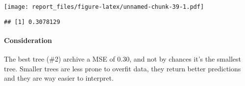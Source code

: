 \documentclass[
]{article}
\newenvironment{Shaded}{\begin{snugshade}}{\end{snugshade}}
\newcommand{\DecValTok}[1]{\textcolor[rgb]{0.00,0.00,0.81}{#1}}
\newcommand{\FunctionTok}[1]{\textcolor[rgb]{0.00,0.00,0.00}{#1}}
\newcommand{\NormalTok}[1]{#1}
\newcommand{\SpecialCharTok}[1]{\textcolor[rgb]{0.00,0.00,0.00}{#1}}
\begin{document}
\texttt{[image: report\_files/figure-latex/unnamed-chunk-39-1.pdf]}

\begin{Shaded}
\end{Shaded}

\begin{verbatim}
## [1] 0.3078129
\end{verbatim}

\hypertarget{consideration}{%
\paragraph{Consideration}\label{consideration}}

The best tree (\#2) archive a MSE of 0.30, and not by chances it's the
smallest tree. Smaller trees are less prone to overfit data, they return
better predictions and they are way easier to interpret.
\end{document}
